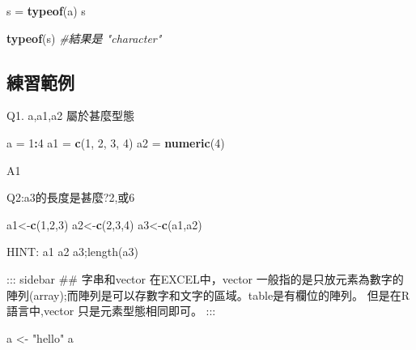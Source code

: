 \documentclass[]{book}
\newenvironment{Shaded}{\begin{snugshade}}{\end{snugshade}}
\newcommand{\KeywordTok}[1]{\textcolor[rgb]{0.13,0.29,0.53}{\textbf{#1}}}
\newcommand{\DecValTok}[1]{\textcolor[rgb]{0.00,0.00,0.81}{#1}}
\newcommand{\StringTok}[1]{\textcolor[rgb]{0.31,0.60,0.02}{#1}}
\newcommand{\CommentTok}[1]{\textcolor[rgb]{0.56,0.35,0.01}{\textit{#1}}}
\newcommand{\OperatorTok}[1]{\textcolor[rgb]{0.81,0.36,0.00}{\textbf{#1}}}
\newcommand{\NormalTok}[1]{#1}
\theoremstyle{definition}
\theoremstyle{definition}
\theoremstyle{definition}
\theoremstyle{remark}
\begin{document}
\begin{Shaded}
\begin{Highlighting}[]
\NormalTok{s =}\StringTok{ }\KeywordTok{typeof}\NormalTok{(a)}
\NormalTok{s}
\end{Highlighting}
\end{Shaded}

\begin{Shaded}
\begin{Highlighting}[]
\KeywordTok{typeof}\NormalTok{(s) }\CommentTok{#結果是 "character"}
\end{Highlighting}
\end{Shaded}

\subsection{練習範例}

Q1. a,a1,a2 屬於甚麼型態

\begin{Shaded}
\begin{Highlighting}[]
\NormalTok{a =}\StringTok{ }\DecValTok{1}\OperatorTok{:}\DecValTok{4}
\NormalTok{a1 =}\StringTok{ }\KeywordTok{c}\NormalTok{(}\DecValTok{1}\NormalTok{, }\DecValTok{2}\NormalTok{, }\DecValTok{3}\NormalTok{, }\DecValTok{4}\NormalTok{)}
\NormalTok{a2 =}\StringTok{ }\KeywordTok{numeric}\NormalTok{(}\DecValTok{4}\NormalTok{)}
\end{Highlighting}
\end{Shaded}

A1

Q2:a3的長度是甚麼?2,或6

\begin{Shaded}
\begin{Highlighting}[]
\NormalTok{a1<-}\KeywordTok{c}\NormalTok{(}\DecValTok{1}\NormalTok{,}\DecValTok{2}\NormalTok{,}\DecValTok{3}\NormalTok{)}
\NormalTok{a2<-}\KeywordTok{c}\NormalTok{(}\DecValTok{2}\NormalTok{,}\DecValTok{3}\NormalTok{,}\DecValTok{4}\NormalTok{)}
\NormalTok{a3<-}\KeywordTok{c}\NormalTok{(a1,a2)}
\end{Highlighting}
\end{Shaded}

HINT: a1 a2 a3;length(a3)

::: sidebar \#\# 字串和vector 在EXCEL中，vector
一般指的是只放元素為數字的陣列(array);而陣列是可以存數字和文字的區域。table是有欄位的陣列。
但是在R語言中,vector 只是元素型態相同即可。 :::

\begin{Shaded}
\begin{Highlighting}[]
\NormalTok{a <-}\StringTok{ "hello"}
\NormalTok{a}
\end{Highlighting}
\end{Shaded}
\end{document}
